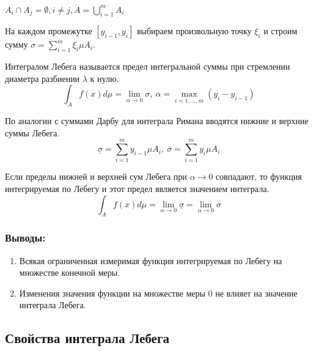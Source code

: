 \documentclass[14pt,a4paper]{extarticle}
\theoremstyle{definition}
\theoremstyle{remark}
\renewcommand{\[}{\begin{dmath*}[compact]}
\renewcommand{\]}{\end{dmath*}}
\newcommand{\be}{\begin{enumerate}}
\newcommand{\ee}{\end{enumerate}}
\newcommand{\sep}{ , \ \allowbreak }
\begin{document}
$A_i \cap A_j = \emptyset, i \neq j, A=\bigcup_{i=1}^m A_i$

На каждом промежутке $[y_{i-1}, y_i]$ выбираем произвольную точку $\xi_i$ и строим сумму $\sigma = \sum _{i=1}^m \xi_i \mu A_i$.

Интегралом Лебега называется предел интегральной суммы при стремлении диаметра разбиении $\lambda$ к нулю.
\[\int_A f(x) d\mu=\lim_{\alpha \to 0} \sigma \sep \alpha=\max_{i=1,\dots,m}(y_i-y_{i-1})\]

По аналогии с суммами Дарбу для интеграла Римана вводятся нижние и верхние суммы Лебега.
\[\underline{\sigma} = \sum _{i=1}^m y_{i-1}\mu A_i \sep \overline{\sigma} = \sum _{i=1}^m y_{i}\mu A_i\]

Если пределы нижней и верхней сум Лебега при $\alpha \to 0$ совпадают, то функция интегрируемая по Лебегу и этот предел является значением интеграла.
\[\int_A f(x) d\mu=\lim_{\alpha \to 0} \underline{\sigma} = \lim_{\alpha \to 0} \overline{\sigma}\]

\subsubsection{Выводы:}
\be
  \item Всякая ограниченная измеримая функция интегрируемая по Лебегу на множестве конечной меры.
  \item Изменения значения функции на множестве меры 0 не влияет на значение интеграла Лебега.
\ee

\subsection{Свойства интеграла Лебега}
\end{document}
